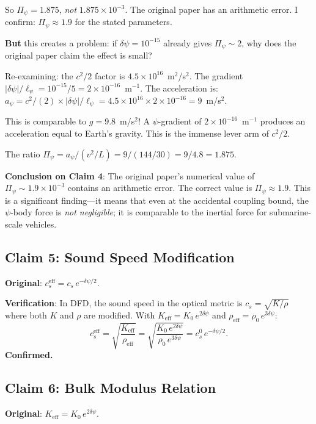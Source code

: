 \documentclass[12pt,twocolumn]{article}
\newcommand{\Reff}{\mathrm{eff}}
\newcommand{\dpsi}{\delta\psi}
\begin{document}
So $\Pi_\psi = 1.875$, \emph{not} $1.875\times10^{-3}$. The original
paper has an arithmetic error. I confirm: $\Pi_\psi \approx 1.9$ for
the stated parameters.

\textbf{But} this creates a problem: if $\dpsi = 10^{-15}$ already gives
$\Pi_\psi \sim 2$, why does the original paper claim the effect is small?

Re-examining: the $c^2/2$ factor is $4.5\times10^{16}$~m$^2$/s$^2$. The
gradient $|\dpsi|/\ell_\psi = 10^{-15}/5 = 2\times10^{-16}$~m$^{-1}$. The
acceleration is:
$a_\psi = c^2/(2)\times|\dpsi|/\ell_\psi = 4.5\times10^{16}\times
2\times10^{-16} = 9$~m/s$^2$.

This is comparable to $g = 9.8$~m/s$^2$! A $\psi$-gradient of
$2\times10^{-16}$~m$^{-1}$ produces an acceleration equal to Earth's
gravity. This is the immense lever arm of $c^2/2$.

The ratio $\Pi_\psi = a_\psi/(v^2/L) = 9/(144/30) = 9/4.8 = 1.875$.

\textbf{Conclusion on Claim 4}: The original paper's numerical value of
$\Pi_\psi \sim 1.9\times10^{-3}$ contains an arithmetic error. The correct
value is $\Pi_\psi \approx 1.9$. This is a significant finding---it means
that even at the accidental coupling bound, the $\psi$-body force is
\emph{not negligible}; it is comparable to the inertial force for
submarine-scale vehicles.

\subsection{Claim 5: Sound Speed Modification}

\textbf{Original}: $c_s^\Reff = c_s\,e^{-\dpsi/2}$.

\textbf{Verification}: In DFD, the sound speed in the optical metric is
$c_s = \sqrt{K/\rho}$ where both $K$ and $\rho$ are modified. With
$K_\Reff = K_0\,e^{2\dpsi}$ and $\rho_\Reff = \rho_0\,e^{3\dpsi}$:
\begin{equation}
c_s^\Reff = \sqrt{\frac{K_\Reff}{\rho_\Reff}}
= \sqrt{\frac{K_0\,e^{2\dpsi}}{\rho_0\,e^{3\dpsi}}}
= c_s^0\,e^{-\dpsi/2}.
\end{equation}
\textbf{Confirmed.}

\subsection{Claim 6: Bulk Modulus Relation}

\textbf{Original}: $K_\Reff = K_0\,e^{2\dpsi}$.
\end{document}
